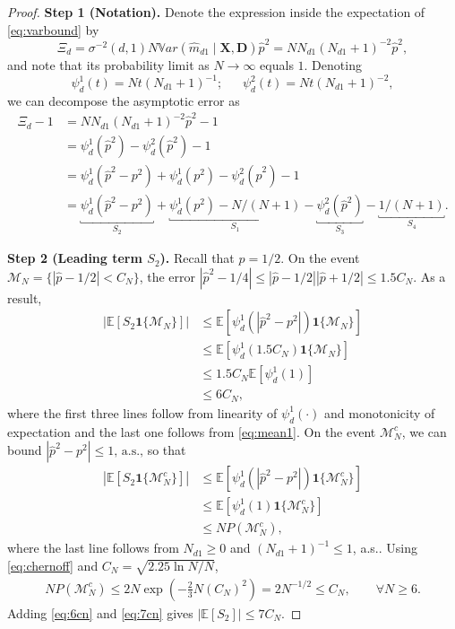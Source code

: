 \documentclass[10pt,a4paper]{amsart}
\newcommand{\E}{\mathbb{E}}
\newcommand{\Var}{\mathbb{V}ar}
\begin{document}
\begin{proof}

\textbf{Step 1 (Notation).} Denote the expression inside the expectation of \eqref{eq:varbound} by
$$
\Xi_d = \sigma^{-2}(d,1)  N \Var ( \widehat m_{d1} \mid \mathbf{X}, \mathbf{D})   \widehat{p}^2 = N N_{d1}(N_{d1}  + 1)^{-2} \widehat{p}^2,
$$
and note that its probability limit  as $N \to \infty$ equals $1$. Denoting 
$$\psi^1_{d} (t)= N t  (N_{d1} + 1)^{-1}; \;\; \quad \psi^2_{d} (t)= N t  (N_{d1} + 1)^{-2},
$$ 
we can decompose the asymptotic error as 
\begin{align}
\label{eq:vardecomp}
\Xi_d -1 &= N N_{d1}(N_{d1}  + 1)^{-2} \widehat{p}^2-1\\[2mm]
&= \psi^1_{d} (\widehat{p}^2) - \psi^2_{d}(\widehat{p}^2) - 1 \nonumber \\[2mm]
&=  \psi^1_{d} (\widehat{p}^2 -p^2) + \psi^1_d (p^2) -  \psi^2_{d}(\widehat{p}^2) - 1 \nonumber \\[2mm]
&=\underbracket{\psi^1_{d} (\widehat{p}^2-p^2)}_{S_2}   + \underbracket{\psi^1_{d} (p^2) -  N/(N+1) }_{S_1} - \underbracket{\psi^2_{d}(\widehat{p}^2)}_{S_3}  -\underbracket{1/(N+1)}_{S_4}. \nonumber 
\end{align}

\noindent 
\textbf{Step 2 (Leading term $S_2$).}  Recall that $p = 1/2$. On the event $\mathcal{M}_N = \{ |\widehat p - 1/2| <  C_N \}$, the error $ |\widehat p^2 -1/4| \leq |\widehat{p} - 1/2||\widehat{p} + 1/2| \leq 1.5C_N$. As a result, 
\begin{align}
  |\E\left[S_2 \bm{1}\{ \mathcal{M}_N  \}\right] | &\leq  \E \left[ \psi^1_{d} (|\widehat p^2 - p^2|)  \bm{1}\{ \mathcal{M}_N  \}\right]  \nonumber \\[2mm]
   &\leq \E [ \psi^1_{d} (1.5C_N)   \bm{1}\{ \mathcal{M}_N  \}] \nonumber  \\[2mm]
   &\leq 1.5C_N \E [ \psi_{d}^1(1)] \nonumber \\[2mm]
   & \leq 6C_N, \label{eq:6cn}
\end{align}
 where the first three lines follow from linearity of $\psi^1_d(\cdot)$ and monotonicity of expectation and the last one follows from \eqref{eq:mean1}.  On the  event $\mathcal{M}_N^c$, we can bound $ |\widehat p^2 -p^2| \leq 1 \text{, a.s.,}$ so that
\begin{align*}
    |\E [S_2 \bm{1}\{ \mathcal{M}^c_N  \}] | &\leq \E [ \psi^1_{d} (|\widehat p^2 - p^2|)  \bm{1}\{ \mathcal{M}^c_N  \}]  \\[2mm]
   & \leq \E [ \psi^1_{d} (1)  \bm{1}\{ \mathcal{M}^c_N  \}] \\[2mm]
   & \leq N  P (\mathcal{M}_N^c), 
   \end{align*}   
   where the last line follows from $N_{d1}\geq 0$ and $(N_{d1} +1)^{-1} \leq 1$, a.s.. Using \eqref{eq:chernoff} and $C_N = \sqrt{ 2.25 \ln N/N}$,
\begin{align}
 \textstyle N P (\mathcal{M}^c_N)  \leq 2 N \exp(-\frac{2}{3}N (C_N)^2 ) = 2 N^{-1/2} \leq C_N, \qquad \forall N \geq 6. \label{eq:7cn}
\end{align}
Adding \eqref{eq:6cn} and \eqref{eq:7cn} gives
$ |\E[S_2]|  \leq 7 C_N. $ 


\end{proof}
\end{document}
